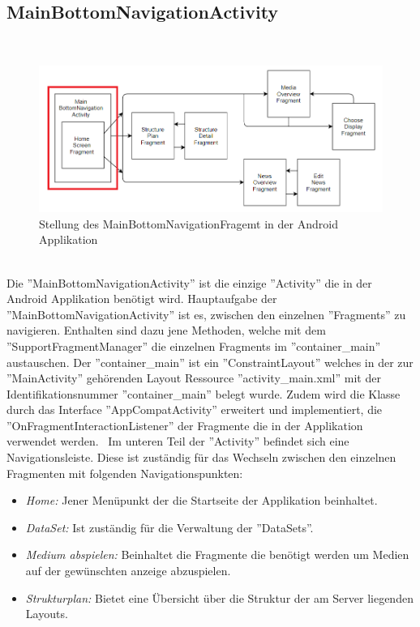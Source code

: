 \subsection{MainBottomNavigationActivity}
\\
\begin{figure}[H]
\centering
\includegraphics[width=1.0\textwidth]{images/06_AndroidApp/06_AndroidArchMainBottomNavigationActivity}
\caption{Stellung des MainBottomNavigationFragemt in der Android Applikation}
\label{fig:mediaNav}
\end{figure}
\\
Die ''MainBottomNavigationActivity'' ist die einzige ''Activity'' die in der Android Applikation benötigt wird. Hauptaufgabe der ''MainBottomNavigationActivity'' ist es, zwischen den einzelnen ''Fragments'' zu navigieren. Enthalten sind dazu jene Methoden, welche mit dem ''SupportFragmentManager'' die einzelnen Fragments im ''container\_main'' austauschen. Der ''container\_main'' ist ein ''ConstraintLayout'' welches in der zur ''MainActivity'' gehörenden Layout Ressource ''activity\_main.xml'' mit der Identifikationsnummer ''container\_main''  belegt wurde. Zudem wird die Klasse durch das Interface ''AppCompatActivity'' erweitert und implementiert, die ''OnFragmentInteractionListener'' der Fragmente die in der Applikation verwendet werden. 
\
Im unteren Teil der ''Activity'' befindet sich eine Navigationsleiste. Diese ist zuständig für das Wechseln zwischen den einzelnen Fragmenten mit folgenden Navigationspunkten: 

\begin{itemize}
	\item {\em Home:} Jener Menüpunkt der die Startseite der Applikation beinhaltet.
	\item {\em DataSet:} Ist zuständig für die Verwaltung der ''DataSets''.
	\item{\em Medium abspielen:} Beinhaltet die Fragmente die benötigt werden um Medien auf der gewünschten anzeige abzuspielen.
	\item {\em Strukturplan:} Bietet eine Übersicht über die Struktur der am Server liegenden Layouts.
\end{itemize}
